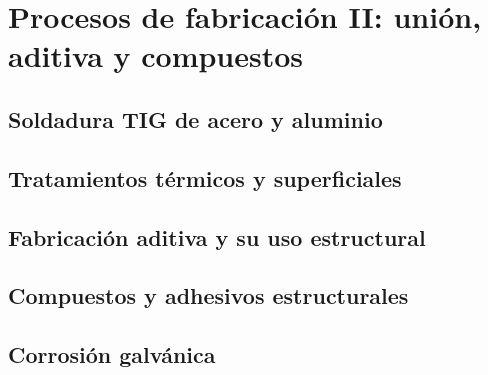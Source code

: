 \chapter{Procesos de fabricación II: unión, aditiva y compuestos}
\label{ch:fabricacion_ii}

\begin{objetivos}
  \item {}
  \item {}
  \item {}
\end{objetivos}


\section{Soldadura TIG de acero y aluminio}
\label{sec:fabricacion_ii:01}

\section{Tratamientos térmicos y superficiales}
\label{sec:fabricacion_ii:02}

\section{Fabricación aditiva y su uso estructural}
\label{sec:fabricacion_ii:03}

\section{Compuestos y adhesivos estructurales}
\label{sec:fabricacion_ii:04}

\section{Corrosión galvánica}
\label{sec:fabricacion_ii:05}

